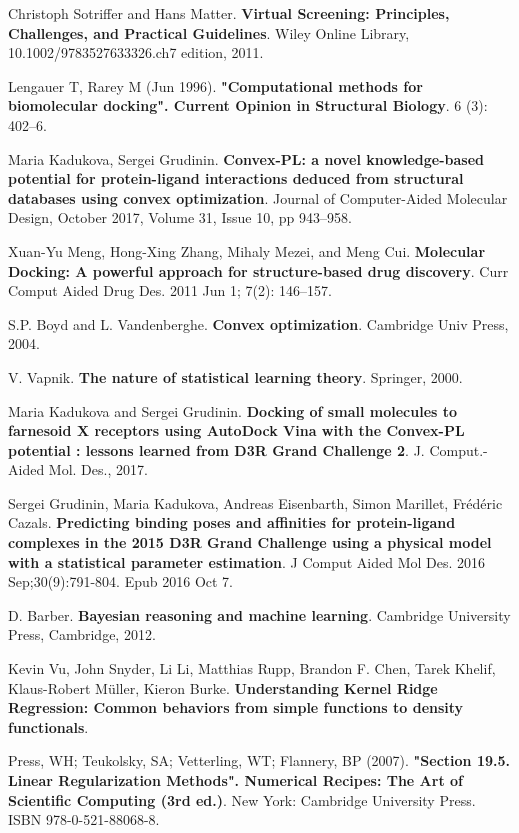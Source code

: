 \documentclass[preprint,12pt,3p]{elsarticle}
\begin{document}
\begin{thebibliography}{4}
Christoph Sotriffer and Hans Matter. 
\textbf{Virtual Screening: Principles, Challenges, and Practical Guidelines}. 
Wiley Online Library, 10.1002/9783527633326.ch7 edition, 2011.
 
Lengauer T, Rarey M (Jun 1996).  
\textbf{"Computational methods for biomolecular docking". Current Opinion in Structural Biology}. 
6 (3): 402–6.
 
Maria Kadukova, Sergei Grudinin.
\textbf{Convex-PL: a novel knowledge-based potential for protein-ligand interactions deduced from structural databases using convex optimization}.
Journal of Computer-Aided Molecular Design, October 2017, Volume 31, Issue 10, pp 943–958.

Xuan-Yu Meng, Hong-Xing Zhang, Mihaly Mezei, and Meng Cui.
\textbf{Molecular Docking: A powerful approach for structure-based drug discovery}.
Curr Comput Aided Drug Des. 2011 Jun 1; 7(2): 146–157.

S.P. Boyd and L. Vandenberghe.
\textbf{Convex optimization}.
Cambridge Univ Press, 2004.

V. Vapnik.
\textbf{The nature of statistical learning theory}.
Springer, 2000.

Maria Kadukova and Sergei Grudinin.
\textbf{Docking of small molecules to farnesoid X receptors using AutoDock Vina with the Convex-PL potential : lessons learned from D3R Grand Challenge 2}.
J. Comput.-Aided Mol. Des., 2017. 

Sergei Grudinin, Maria Kadukova, Andreas Eisenbarth, Simon Marillet, Frédéric Cazals.
\textbf{Predicting binding poses and affinities for protein-ligand complexes in the 2015 D3R Grand Challenge using a physical model with a statistical parameter estimation}.
J Comput Aided Mol Des. 2016 Sep;30(9):791-804. Epub 2016 Oct 7.

D. Barber.
\textbf{Bayesian reasoning and machine learning}.
Cambridge University Press, Cambridge, 2012.

Kevin Vu, John Snyder, Li Li, Matthias Rupp, Brandon F. Chen, Tarek Khelif, Klaus-Robert Müller, Kieron Burke.
\textbf{Understanding Kernel Ridge Regression: Common behaviors from simple functions to density functionals}.

Press, WH; Teukolsky, SA; Vetterling, WT; Flannery, BP (2007).
\textbf{"Section 19.5. Linear Regularization Methods". Numerical Recipes: The Art of Scientific Computing (3rd ed.)}.
New York: Cambridge University Press. ISBN 978-0-521-88068-8.


\end{thebibliography}
\end{document}
